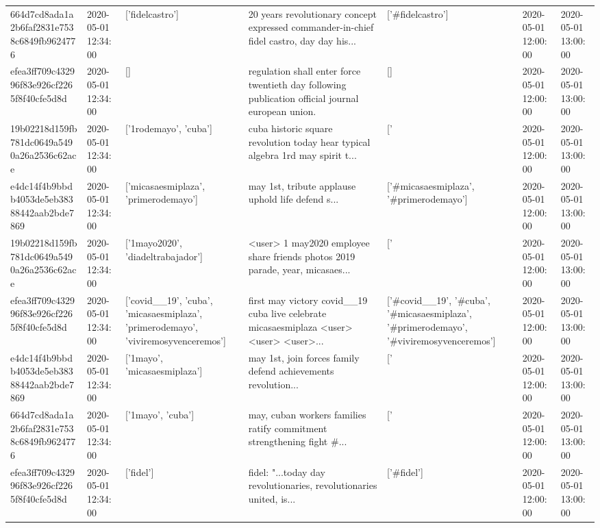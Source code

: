 \begin{tabular}{lllllll}
664d7cd8ada1a2b6faf2831e7538c6849fb9624776 & 2020-05-01 12:34:00 & ['fidelcastro'] & 20 years revolutionary concept expressed commander-in-chief fidel castro, day day his... & ['#fidelcastro'] & 2020-05-01 12:00:00 & 2020-05-01 13:00:00 \\
efea3ff709c432996f83e926cf2265f8f40cfe5d8d & 2020-05-01 12:34:00 & [] & regulation shall enter force twentieth day following publication official journal european union. & [] & 2020-05-01 12:00:00 & 2020-05-01 13:00:00 \\
19b02218d159fb781dc0649a5490a26a2536c62ace & 2020-05-01 12:34:00 & ['1rodemayo', 'cuba'] & cuba historic square revolution today hear typical algebra 1rd may spirit t... & ['#1rodemayo', '#cuba'] & 2020-05-01 12:00:00 & 2020-05-01 13:00:00 \\
e4dc14f4b9bbdb4053de5eb38388442aab2bde7869 & 2020-05-01 12:34:00 & ['micasaesmiplaza', 'primerodemayo'] & may 1st, tribute applause uphold life defend s... & ['#micasaesmiplaza', '#primerodemayo'] & 2020-05-01 12:00:00 & 2020-05-01 13:00:00 \\
19b02218d159fb781dc0649a5490a26a2536c62ace & 2020-05-01 12:34:00 & ['1mayo2020', 'diadeltrabajador'] & <user> 1 may2020 employee share friends photos 2019 parade, year, micasaes... & ['#1mayo2020', '#diadeltrabajador'] & 2020-05-01 12:00:00 & 2020-05-01 13:00:00 \\
efea3ff709c432996f83e926cf2265f8f40cfe5d8d & 2020-05-01 12:34:00 & ['covid__19', 'cuba', 'micasaesmiplaza', 'primerodemayo', 'viviremosyvenceremos'] & first may victory covid\_\_19 cuba live celebrate micasaesmiplaza <user> <user> <user>... & ['#covid__19', '#cuba', '#micasaesmiplaza', '#primerodemayo', '#viviremosyvenceremos'] & 2020-05-01 12:00:00 & 2020-05-01 13:00:00 \\
e4dc14f4b9bbdb4053de5eb38388442aab2bde7869 & 2020-05-01 12:34:00 & ['1mayo', 'micasaesmiplaza'] & may 1st, join forces family defend achievements revolution... & ['#1mayo', '#micasaesmiplaza'] & 2020-05-01 12:00:00 & 2020-05-01 13:00:00 \\
664d7cd8ada1a2b6faf2831e7538c6849fb9624776 & 2020-05-01 12:34:00 & ['1mayo', 'cuba'] & may, cuban workers families ratify commitment strengthening fight \#... & ['#1mayo', '#cuba'] & 2020-05-01 12:00:00 & 2020-05-01 13:00:00 \\
efea3ff709c432996f83e926cf2265f8f40cfe5d8d & 2020-05-01 12:34:00 & ['fidel'] & fidel: "...today day revolutionaries, revolutionaries united, is... & ['#fidel'] & 2020-05-01 12:00:00 & 2020-05-01 13:00:00 \\

\end{tabular}
